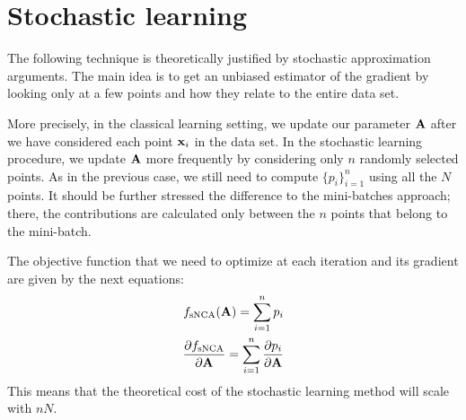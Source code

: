 

\section{Stochastic learning}
\label{sec:stochastic-learning}

The following technique is theoretically justified by stochastic approximation arguments. The main idea is to get an unbiased estimator of the gradient by looking only at a few points and how they relate to the entire data set.

More precisely, in the classical learning setting, we update our parameter $\mathbf{A}$ after we have considered each point $\mathbf{x}_i$ in the data set. In the stochastic learning procedure, we update $\mathbf{A}$ more frequently by considering only $n$ randomly selected points. As in the previous case, we still need to compute $\{p_i\}_{i=1}^n$ using all the $N$ points. It should be further stressed the difference to the mini-batches approach; there, the contributions are calculated only between the $n$ points that belong to the mini-batch. 

The objective function that we need to optimize at each iteration and its gradient are given by the next equations:
\begin{align}
	f_\text{sNCA}(\mathbf{A}) = \sum_{i=1}^n p_i\\
	\frac{\partial f_\text{sNCA}}{\partial \mathbf{A}} = \sum_{i=1}^{n} \frac{\partial p_i}{\partial \mathbf{A}}
	\label{eq:snca-grad}
\end{align}
This means that the theoretical cost of the stochastic learning method will scale with $nN$.

